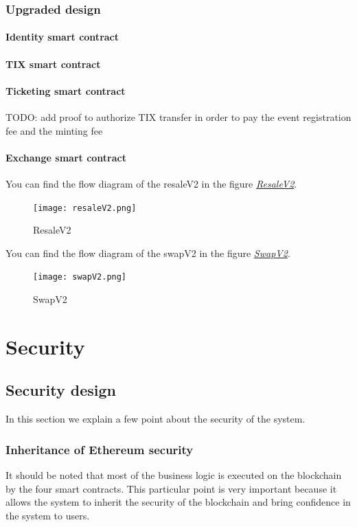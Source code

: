 \documentclass[a4paper,11pt,oneside]{report}
\begin{document}
\subsection{Upgraded design}

\subsubsection{Identity smart contract}

\subsubsection{TIX smart contract}

\subsubsection{Ticketing smart contract}
TODO: add proof to authorize TIX transfer in order to pay the event registration fee and the minting fee

\subsubsection{Exchange smart contract}

You can find the flow diagram of the resaleV2 in the figure \hyperref[fig:resaleV2]{ \textit{ResaleV2}}.

\begin{figure}[h!]
  \texttt{[image: resaleV2.png]}
  \caption{ResaleV2}
  \label{fig:resaleV2}
\end{figure}

You can find the flow diagram of the swapV2 in the figure \hyperref[fig:swapV2]{ \textit{SwapV2}}.

\begin{figure}[h!]
  \texttt{[image: swapV2.png]}
  \caption{SwapV2}
  \label{fig:swapV2}
\end{figure}

\chapter{Security}

\section{Security design}
In this section we explain a few point about the security of the system.

\subsection{Inheritance of Ethereum security}
It should be noted that most of the business logic is executed on the blockchain by the four smart contracts. This particular point is very important because it allows the system to inherit the security of the blockchain and bring confidence in the system to users.
\end{document}
